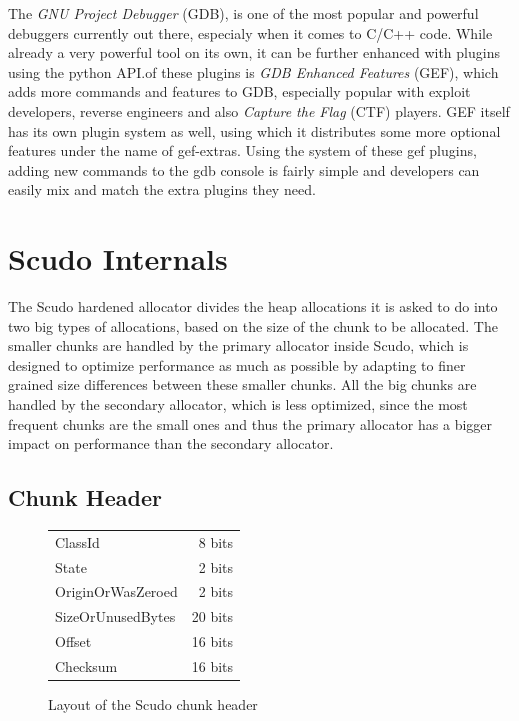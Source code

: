 \documentclass[a4paper,11pt,oneside]{report}
\begin{document}
The \emph{GNU Project Debugger} (GDB), is one of the most popular and powerful
debuggers currently out there, especialy when it comes to C/C++ code. While
already a very powerful tool on its own, it can be further enhanced with
plugins using the python API.\@One of these plugins is \emph{GDB Enhanced Features}
(GEF), which adds more commands and features to GDB, especially popular with
exploit developers, reverse engineers and also \emph{Capture the Flag} (CTF)
players. GEF itself has its own plugin system as well, using which it distributes
some more optional features under the name of gef-extras. Using the system of
these gef plugins, adding new commands to the gdb console is fairly simple and
developers can easily mix and match the extra plugins they need.


\chapter{Scudo Internals}

The Scudo hardened allocator divides the heap allocations it is asked to do into
two big types of allocations, based on the size of the chunk to be allocated.
The smaller chunks are handled by the primary allocator inside Scudo, which is
designed to optimize performance as much as possible by adapting to finer grained
size differences between these smaller chunks. All the big chunks are handled by
the secondary allocator, which is less optimized, since the most frequent chunks
are the small ones and thus the primary allocator has a bigger impact on performance
than the secondary allocator.

\section{Chunk Header}

\begin{figure}[h]
  \centering
  \begin{tabular}{lr}
    ClassId           & 8 bits  \\
    State             & 2 bits  \\
    OriginOrWasZeroed & 2 bits  \\
    SizeOrUnusedBytes & 20 bits \\
    Offset            & 16 bits \\
    Checksum          & 16 bits
  \end{tabular}
  \caption{Layout of the Scudo chunk header}
  \label{fig:ScudoChunkHeader}
\end{figure}
\end{document}
